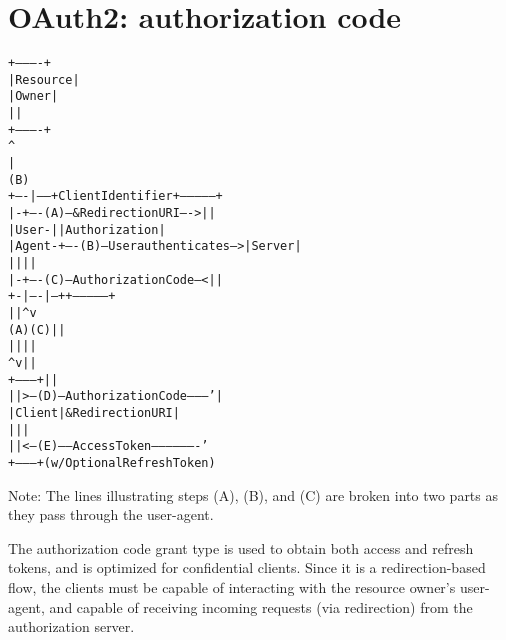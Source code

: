 \section{OAuth2: authorization code}
\label{sec:auth-code}
\begin{alltt}
     +----------+
     | Resource |
     |   Owner  |
     |          |
     +----------+
          ^
          |
         (B)
     +----|-----+          Client Identifier      +---------------+
     |         -+----(A)-- & Redirection URI ---->|               |
     |  User-   |                                 | Authorization |
     |  Agent  -+----(B)-- User authenticates --->|     Server    |
     |          |                                 |               |
     |         -+----(C)-- Authorization Code ---<|               |
     +-|----|---+                                 +---------------+
       |    |                                         ^      v
      (A)  (C)                                        |      |
       |    |                                         |      |
       ^    v                                         |      |
     +---------+                                      |      |
     |         |>---(D)-- Authorization Code ---------'      |
     |  Client |          & Redirection URI                  |
     |         |                                             |
     |         |<---(E)----- Access Token -------------------'
     +---------+       (w/ Optional Refresh Token)

 \end{alltt}
Note: The lines illustrating steps (A), (B), and (C) are broken into
two parts as they pass through the user-agent.


The authorization code grant type is used to obtain both access and refresh
tokens, and is optimized for confidential clients.
Since it is a redirection-based flow, the clients must be capable of interacting
with the resource owner's user-agent, and capable of receiving incoming requests
(via redirection) from the authorization server.

